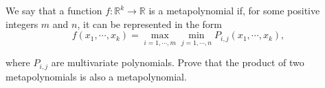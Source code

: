 We say that a function 
$f:\mathbb{R}^k \rightarrow \mathbb{R}$
 is a metapolynomial if, for some positive integers 
$m$
 and 
$n$, 
 it can be represented in the form
\[f(x_1,\cdots , x_k )=\max_{i=1,\cdots , m} \min_{j=1,\cdots , n}P_{i,j}(x_1,\cdots , x_k),\]


where 
$P_{i,j}$
 are multivariate polynomials. Prove that the product of two metapolynomials is also a metapolynomial.
